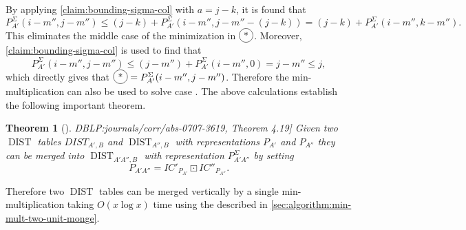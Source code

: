 \documentclass[twoside,11pt,openright]{report}
\newcommand{\DIST}{\operatorname{DIST}}
\newcommand*{\circled}[1]{\tikz[baseline=(char.base)]{
                          \node[shape=circle,draw,inner sep=2pt] (char) {#1};}}
\newcommand{\refbook}[2]{\cite[#1]{DBLP:journals/corr/abs-0707-3619}, #2}
\newtheorem{theorem}{Theorem}
\begin{document}
By applying \cref{claim:bounding-sigma-col} with $a = j - k$, it is found that
\[
  P_{A'}^{\Sigma}(i - m'', j - m'') \leq (j - k) + P_{A'}^{\Sigma}(i - m'', j - m'' - (j - k)) = (j - k) + P_{A'}^{\Sigma}(i - m'', k - m'').
\]
This eliminates the middle case of the minimization in $\circled{*}$. Moreover, \cref{claim:bounding-sigma-col} is used to find that
\[
  P_{A'}^{\Sigma}(i - m'', j - m'') \leq (j - m'') + P_{A'}^{\Sigma}(i - m'', 0) = j - m'' \leq j,
\]
which directly gives that $\circled{*} = P_{A'}^{\Sigma}(i - m'', j - m'')$. Therefore the min-multiplication can also be used to solve case \circled{2}. The above calculations establish the following important theorem.
\begin{theorem}[\refbook{p.-55}{Theorem 4.19}]
  Given two $\DIST$ tables $DIST_{A',B}$ and $\DIST_{A'',B}$ with representations $P_{A'}$ and $P_{A''}$ they can be merged into $\DIST_{A'A'',B}$ with representation $P_{A'A''}^{\Sigma}$ by setting
  \[
    P_{A'A''} = IC'_{P_{A'}} \boxdot IC''_{P_{A''}} .
  \]
\end{theorem}

 Therefore two $\DIST$ tables can be merged vertically by a single min-multiplication taking $O(x \log{x})$ time using the described in \cref{sec:algorithm:min-mult-two-unit-monge}.
\end{document}
